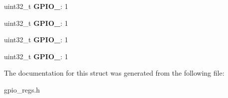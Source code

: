 \begin{DoxyCompactItemize}
\item 
\hypertarget{structGPIO__DATAOUT_af9b4b9d10b37bf818cbe801c19db8beb}{uint32\-\_\-t {\bfseries G\-P\-I\-O\-\_}\-: 1}\label{structGPIO__DATAOUT_af9b4b9d10b37bf818cbe801c19db8beb}

\item 
\hypertarget{structGPIO__DATAOUT_a44dd28321506d621cf043a8791f97c08}{uint32\-\_\-t {\bfseries G\-P\-I\-O\-\_}\-: 1}\label{structGPIO__DATAOUT_a44dd28321506d621cf043a8791f97c08}

\item 
\hypertarget{structGPIO__DATAOUT_a72d4b1a569738101b93ca9bbaa9bb7c4}{uint32\-\_\-t {\bfseries G\-P\-I\-O\-\_}\-: 1}\label{structGPIO__DATAOUT_a72d4b1a569738101b93ca9bbaa9bb7c4}

\item 
\hypertarget{structGPIO__DATAOUT_ac151c4a378c8c904bea9cea3da3c5595}{uint32\-\_\-t {\bfseries G\-P\-I\-O\-\_}\-: 1}\label{structGPIO__DATAOUT_ac151c4a378c8c904bea9cea3da3c5595}

\end{DoxyCompactItemize}


The documentation for this struct was generated from the following file\-:\begin{DoxyCompactItemize}
\item 
gpio\-\_\-regs.\-h\end{DoxyCompactItemize}
